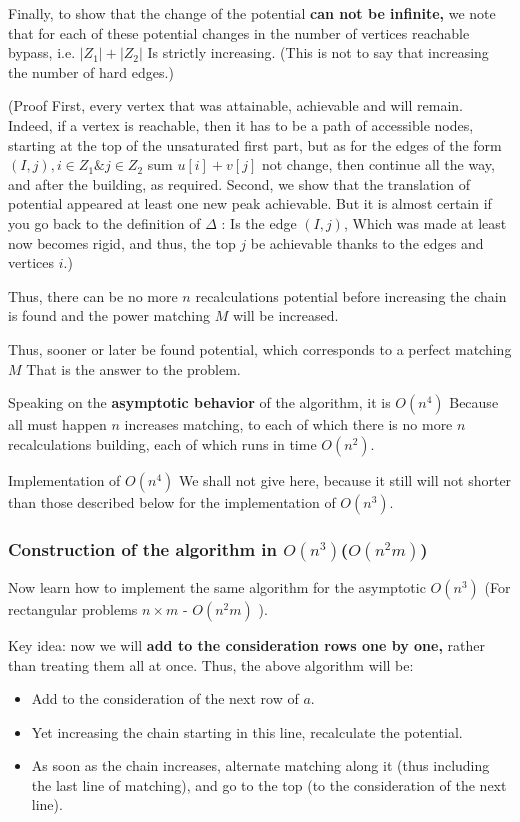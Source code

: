 \begin{itemize}
Finally, to show that the change of the potential \textbf{can not be infinite,} we note that for each of these potential changes in the number of vertices reachable bypass, i.e. $| Z_1 | + | Z_2 |$ Is strictly increasing. (This is not to say that increasing the number of hard edges.)

(Proof First, every vertex that was attainable, achievable and will remain. Indeed, if a vertex is reachable, then it has to be a path of accessible nodes, starting at the top of the unsaturated first part, but as for the edges of the form $(I, j), i \in Z_1 \& j \in Z_2$ sum $u [i] + v [j]$ not change, then continue all the way, and after the building, as required. Second, we show that the translation of potential appeared at least one new peak achievable. But it is almost certain if you go back to the definition of $\Delta$ : Is the edge $(I, j)$, Which was made at least now becomes rigid, and thus, the top $j$ be achievable thanks to the edges and vertices $i$.)

Thus, there can be no more $n$ recalculations potential before increasing the chain is found and the power matching $M$ will be increased.

\end{itemize}

Thus, sooner or later be found potential, which corresponds to a perfect matching $M$ That is the answer to the problem.

Speaking on the \textbf{asymptotic behavior} of the algorithm, it is $O (n ^ 4)$ Because all must happen $n$ increases matching, to each of which there is no more $n$ recalculations building, each of which runs in time $O (n ^ 2)$.

Implementation of $O (n ^ 4)$ We shall not give here, because it still will not shorter than those described below for the implementation of $O (n ^ 3)$.

\subsubsection{ Construction of the algorithm in $O (n ^ 3)$($O (n ^ 2 m)$)}

Now learn how to implement the same algorithm for the asymptotic $O (n ^ 3)$ (For rectangular problems $n \times m$ - $O (n ^ 2 m)$ ).

Key idea: now we will \textbf{add to the consideration rows one by one,} rather than treating them all at once. Thus, the above algorithm will be:

\begin{itemize}

\item Add to the consideration of the next row of $a$.

\item Yet increasing the chain starting in this line, recalculate the potential.

\item As soon as the chain increases, alternate matching along it (thus including the last line of matching), and go to the top (to the consideration of the next line).

\end{itemize}

